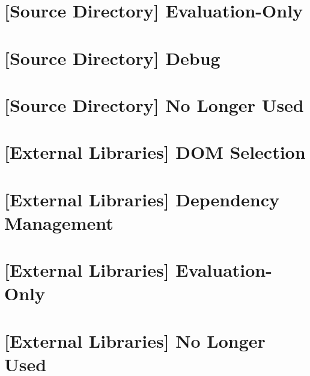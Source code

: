 \documentclass[11pt,openright,a4paper]{report}
\begin{document}
\begin{landscape}
\begin{multicols}{2}
\section{[Source Directory] Evaluation-Only}

\section{[Source Directory] Debug}

\section{[Source Directory] No Longer Used}

\section{[External Libraries] DOM Selection}

\section{[External Libraries] Dependency Management}

\section{[External Libraries] Evaluation-Only}

\section{[External Libraries] No Longer Used}

\end{multicols}
\end{landscape}

\end{document}
